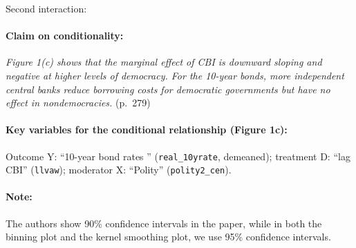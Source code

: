 \documentclass[12pt]{article}
\begin{document}
\noindent Second interaction:

\paragraph{Claim on conditionality:} \emph{Figure 1(c) shows that the marginal effect
of CBI is downward sloping and negative at higher levels
of democracy. For the 10-year bonds, more independent
central banks reduce borrowing costs for democratic governments
but have no effect in nondemocracies.} (p.\ 279)

\paragraph{Key variables for the conditional relationship (Figure 1c):} Outcome Y: ``10-year bond rates '' (\texttt{real\_10yrate}, demeaned); treatment D: ``lag CBI'' (\texttt{llvaw}); moderator X: ``Polity'' (\texttt{polity2\_cen}). 

\paragraph{Note:} The authors show 90\% confidence intervals in the paper, while in both the binning plot and the kernel smoothing plot, we use 95\% confidence intervals.
\end{document}

